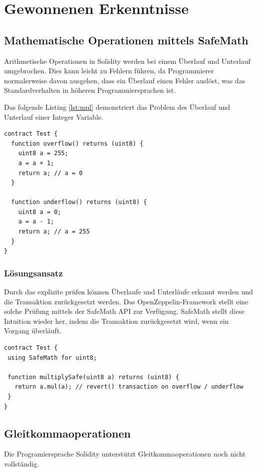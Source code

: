 \section{Gewonnenen Erkenntnisse}


\subsection{Mathematische Operationen mittels SafeMath}
Arithmetische Operationen in Solidity werden bei einem Überlauf und Unterlauf umgebrochen. Dies kann leicht zu Fehlern führen, da Programmierer normalerweise davon ausgehen, dass ein Überlauf einen Fehler auslöst, was das Standardverhalten in höheren Programmiersprachen ist.

Das folgende Listing \ref{lst:mul} demonstriert das Problem des Überlauf und Unterlauf einer Integer Variable.

\begin{lstlisting}[caption={Beispielhafter Überlauf und Unterlauf},captionpos=b,label=lst:mul]
contract Test {
  function overflow() returns (uint8) {
    uint8 a = 255;
    a = a + 1;  	
    return a; // a = 0
  }
  
  function underflow() returns (uint8) {
    uint8 a = 0;
    a = a - 1;  	
    return a; // a = 255
  }
}
\end{lstlisting}

\subsubsection*{Lösungsansatz}
Durch das explizite prüfen können Überlaufe und Unterläufe erkannt werden und die Transaktion zurückgesetzt werden. Das OpenZeppelin-Framework stellt eine solche Prüfung mittels der SafeMath API zur Verfügung. SafeMath stellt diese Intuition wieder her, indem die Transaktion zurückgesetzt wird, wenn ein Vorgang überläuft. \cite{safemath}

\begin{lstlisting}[caption={Beispielhafte Multiplikation mittels SafeMath zurück},captionpos=b,label=lst:mulsafe]
contract Test {
 using SafeMath for uint8;

 function multiplySafe(uint8 a) returns (uint8) {
   return a.mul(a); // revert() transaction on overflow / underflow
 }
}
\end{lstlisting}


\subsection{Gleitkommaoperationen}
Die Programiersprache Solidity unterstützt Gleitkommaoperationen noch nicht vollständig. \cite{fixedpointnumbers}

